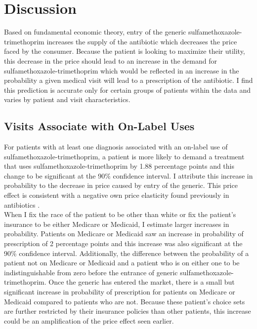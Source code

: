 \chapter{Discussion}
Based on fundamental economic theory, entry of the generic sulfamethoxazole-trimethoprim increases the supply of the antibiotic which decreases the price faced by the consumer. Because the patient is looking to maximize their utility, this decrease in the price should lead to an increase in the demand for sulfamethoxazole-trimethoprim which would be reflected in an increase in the probability a given medical visit will lead to a prescription of the antibiotic. I find this prediction is accurate only for certain groups of patients within the data and varies by patient and visit characteristics.\\
\section{Visits Associate with On-Label Uses}
\indent For patients with at least one diagnosis associated with an on-label use of sulfamethoxazole-trimethoprim, a patient is more likely to demand a treatment that uses sulfamethoxazole-trimethoprim by 1.88 percentage points and this change to be significant at the 90\% confidence interval. I attribute this increase in probability to the decrease in price caused by entry of the generic. This price effect is consistent with a negative own price elasticity found previously in antibiotics \cite{kaier_impact_2013}.\\
\indent When I fix the race of the patient to be other than white or fix the patient's insurance to be either Medicare or Medicaid, I estimate larger increases in probability. Patients on Medicare or Medicaid saw an increase in probability of prescription of 2 percentage points and this increase was also significant at the 90\% confidence interval. Additionally, the difference between the probability of a patient not on Medicare or Medicaid and a patient who is on either one to be indistinguishable from zero before the entrance of generic sulfamethoxazole-trimethoprim. Once the generic has entered the market, there is a small but significant increase in probability of prescription for patients on Medicare or Medicaid compared to patients who are not. Because these patient's choice sets are further restricted by their insurance policies than other patients, this increase could be an amplification of the price effect seen earlier.\\
